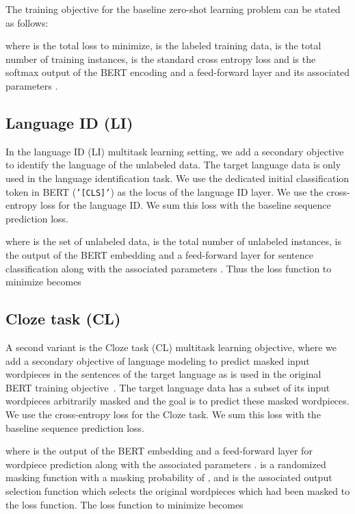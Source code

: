 \documentclass[letterpaper]{article} \usepackage{aaai20}  \usepackage{times}  \usepackage{helvet} \usepackage{courier}  \usepackage[hyphens]{url}  \usepackage{graphicx} \urlstyle{rm} \def\UrlFont{\rm}  \usepackage{graphicx}  \frenchspacing  \setlength{\pdfpagewidth}{8.5in}  \setlength{\pdfpageheight}{11in}  \usepackage{amsmath}
\begin{document}
The training objective for the baseline zero-shot learning problem can be stated as follows:

\noindent where  is the total loss to minimize,  is the labeled training data,  is the total number of training instances,  is the standard cross entropy loss and  is the softmax output of the BERT encoding and a feed-forward layer and its associated parameters .








\subsection{Language ID (LI)}

In the language ID (LI) multitask learning setting,
we add a secondary objective to identify the language of the unlabeled data. The
target language data is only used in the language identification
task. 
We use the dedicated initial classification token in BERT
(\texttt{'[CLS]'}) as the locus of the language ID layer. We use the
cross-entropy loss for the language ID. We sum this loss with the
baseline sequence prediction loss.

where  is the set of unlabeled data,  is the total number of unlabeled instances,  is the output of the BERT embedding and a feed-forward layer for sentence classification along with the associated parameters . Thus the loss function to minimize becomes


\subsection{Cloze task (CL)}

A second variant is the Cloze task (CL) multitask learning objective, where
we add a secondary objective of language modeling to predict masked input wordpieces in the sentences of the target language as is used in the original BERT training objective~\cite{BERT18}.
The target language data has a subset of its input
wordpieces arbitrarily masked and the goal is to predict these masked wordpieces. We use the cross-entropy loss for the Cloze task. We sum this
loss with the baseline sequence prediction loss.

where  is the output of the BERT embedding and a feed-forward layer for wordpiece prediction along with the associated parameters .  is a randomized masking function with a masking probability of , and  is the associated output selection function which selects the original wordpieces which had been masked to the loss function. The loss function to minimize becomes
\end{document}
